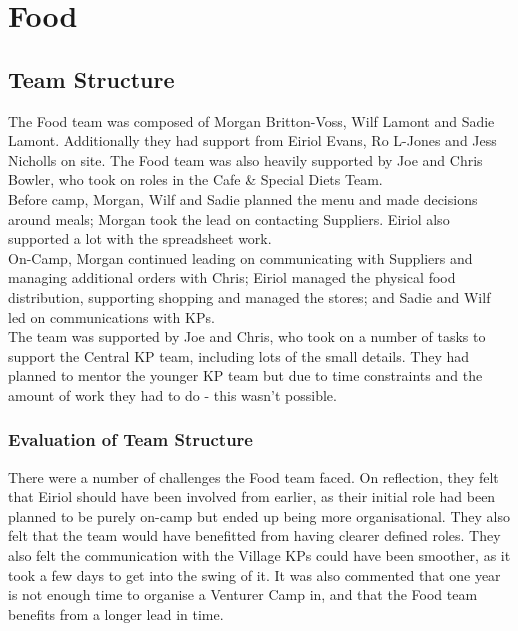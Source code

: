 \chapter{Food}
\section{Team Structure}
The Food team was composed of Morgan Britton-Voss, Wilf Lamont and Sadie Lamont. Additionally they had support from Eiriol Evans, Ro L-Jones and Jess Nicholls on site. The Food team was also heavily supported by Joe and Chris Bowler, who took on roles in the Cafe \& Special Diets Team.\\

Before camp, Morgan, Wilf and Sadie planned the menu and made decisions around meals; Morgan took the lead on contacting Suppliers. Eiriol also supported a lot with the spreadsheet work.\\

On-Camp, Morgan continued leading on communicating with Suppliers and managing additional orders with Chris; Eiriol managed the physical food distribution, supporting shopping and managed the stores; and Sadie and Wilf led on communications with KPs. \\

The team was supported by Joe and Chris, who took on a number of tasks to support the Central KP team, including lots of the small details. They had planned to mentor the younger KP team but due to time constraints and the amount of work they had to do - this wasn't possible.
\subsection{Evaluation of Team Structure}
There were a number of challenges the Food team faced. On reflection, they felt that Eiriol should have been involved from earlier, as their initial role had been planned to be purely on-camp but ended up being more organisational. They also felt that the team would have benefitted from having clearer defined roles. They also felt the communication with the Village KPs could have been smoother, as it took a few days to get into the swing of it. It was also commented that one year is not enough time to organise a Venturer Camp in, and that the Food team benefits from a longer lead in time.\\

